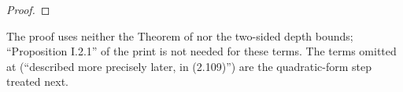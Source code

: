 \begin{proof}
\end{proof}

The proof uses neither the Theorem of \cite{Ba4} nor the two-sided depth bounds; ``Proposition I.2.1'' of the print is not needed for these terms. The terms omitted at \cite[p.~568]{Ba2} (``described more precisely later, in (2.109)'') are the quadratic-form step treated next.
